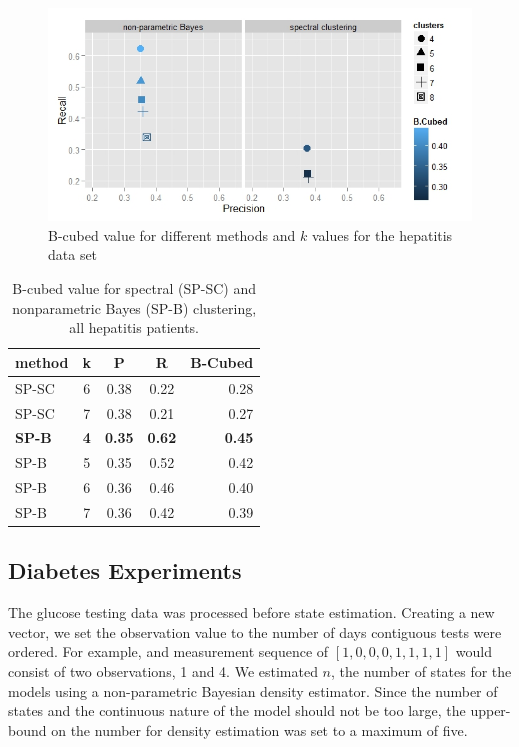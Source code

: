 \begin{figure}[t]
\vskip 0.2in
\begin{center}
\centerline{\includegraphics[width=\columnwidth]{fig/allHep.jpeg}}
\caption{B-cubed value for different methods and $k$ values for the hepatitis data set}
\label{allHep}
\end{center}
\vskip -0.2in
\end{figure}


\begin{table}[ht]
\caption{B-cubed value for spectral (SP-SC) and nonparametric Bayes (SP-B) clustering, all hepatitis patients.}
\label{allHepTable}
\vskip 0.15in
\begin{center}
\begin{small}
\begin{sc}
\begin{tabular}{lcccr}
\hline
\abovespace\belowspace
method	& k	& P	& R	& B-Cubed \\
\hline
\abovespace
SP-SC	         & 6	& 0.38& 0.22& 0.28\\
SP-SC	         & 7	& 0.38& 0.21& 0.27\\
\textbf{SP-B }       & \textbf{4}	& \textbf{0.35}& \textbf{0.62}& \textbf{0.45}\\
SP-B	     & 5	& 0.35& 0.52& 0.42\\
SP-B	     & 6	& 0.36& 0.46& 0.40\\
\belowspace
SP-B	     & 7	& 0.36& 0.42& 0.39\\
\hline
\end{tabular}
\end{sc}
\end{small}
\end{center}
\vskip -0.1in
\end{table}


\subsection{Diabetes Experiments}
The glucose testing data was processed before state estimation.  Creating a new vector, we set the observation value to the number of days contiguous tests were ordered.  For example, and measurement sequence of $[1,0,0,0,1,1,1,1]$ would consist of two observations, 1 and 4.  We estimated $n$, the number of states for the models using a non-parametric Bayesian density estimator.  Since the number of states and the continuous nature of the model should not be too large, the upper-bound on the number for density estimation was set to a maximum of five.


